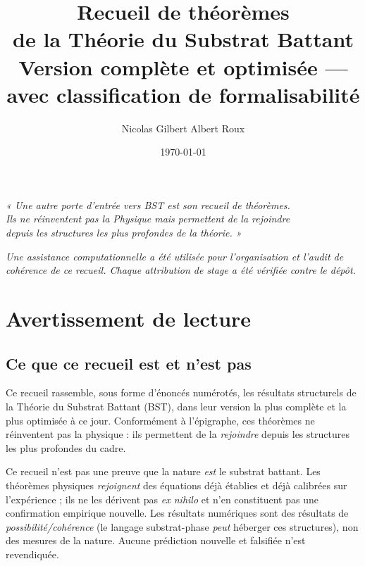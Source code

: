 \documentclass[11pt]{book}
\title{Recueil de théorèmes\\[0.4em]\large de la Théorie du Substrat Battant\\[0.6em]\normalsize Version complète et optimisée --- avec classification de formalisabilité}
\author{Nicolas Gilbert Albert Roux}
\date{\today}
\begin{document}
\frontmatter
\maketitle

\vspace{1em}
\begin{center}\itshape
« Une autre porte d'entrée vers BST est son recueil de théorèmes.\\
Ils ne réinventent pas la Physique mais permettent de la rejoindre\\
depuis les structures les plus profondes de la théorie. »
\end{center}
\vspace{1em}

\begin{center}\small\itshape Une assistance computationnelle a été utilisée pour l'organisation et l'audit de cohérence de ce recueil. Chaque attribution de stage a été vérifiée contre le dépôt.\end{center}

\tableofcontents
\mainmatter

\chapter{Avertissement de lecture}

\section{Ce que ce recueil est et n'est pas}
Ce recueil rassemble, sous forme d'énoncés numérotés, les résultats structurels de la Théorie du Substrat Battant (BST), dans leur version la plus complète et la plus optimisée à ce jour. Conformément à l'épigraphe, ces théorèmes ne réinventent pas la physique : ils permettent de la \emph{rejoindre} depuis les structures les plus profondes du cadre.

Ce recueil n'est pas une preuve que la nature \emph{est} le substrat battant. Les théorèmes physiques \emph{rejoignent} des équations déjà établies et déjà calibrées sur l'expérience ; ils ne les dérivent pas \emph{ex nihilo} et n'en constituent pas une confirmation empirique nouvelle. Les résultats numériques sont des résultats de \emph{possibilité/cohérence} (le langage substrat-phase \emph{peut} héberger ces structures), non des mesures de la nature. Aucune prédiction nouvelle et falsifiée n'est revendiquée.
\end{document}
